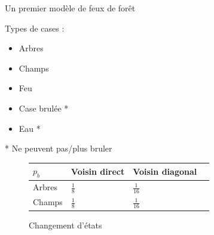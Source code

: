 \documentclass{beamer}
\begin{document}
\begin{frame}{Un premier modèle de feux de forêt \hyperlink{jump}{\beamerbutton{ }} \hypertarget{4}{\beamerbutton{ }}}
    \begin{block}{Types de cases :}
        \begin{itemize}
            \item Arbres
            \item Champs
            \item Feu
            \item Case brulée *
            \item Eau *
        \end{itemize}

        * Ne peuvent pas/plus bruler
    \end{block}

    \begin{figure}
        \begin{center}
            \renewcommand{\arraystretch}{2}
            \setlength{\extrarowheight}{-3pt}
            \begin{table}
                \begin{tabular}{ |C{2cm}|L{3cm}|C{3cm}|N }
                \hline
                $p_{b}$ & Voisin direct & Voisin diagonal \\
                \hline 
                Arbres & \centering $\tfrac{1}{8}$ & $\tfrac{1}{16}$ \\ 
                \hline
                Champs & \centering $\tfrac{1}{8}$ & $\tfrac{1}{16}$ \\
                \hline 
                \end{tabular}
            \end{table}
        \end{center}
        \caption{Changement d'états}
    \end{figure}
\end{frame}
\end{document}
